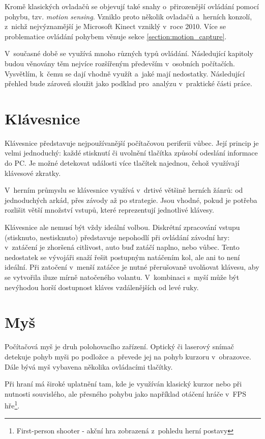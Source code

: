 \documentclass[thesis=B,czech,hidelinks]{FITthesis}[2012/06/26] %
\begin{document}
Kromě klasických ovladačů se objevují také snahy o~přirozenější ovládání pomocí pohybu, tzv. \textit{motion sensing}. Vzniklo proto několik ovladačů a~herních konzolí, z~nichž nejvýznamější je Microsoft Kinect vzniklý v~roce 2010.\cite{wikicontrollers} Více se problematice ovládání pohybem věnuje sekce \ref{section:motion_capture}.

V~současné době se využívá mnoho různých typů ovládání. Následující kapitoly budou věnovány těm nejvíce rozšířeným především v~osobních počítačích. Vysvětlím, k~čemu se dají vhodně využít a~jaké mají nedostatky. Následující přehled bude zároveň sloužit jako podklad pro~analýzu v~praktické části práce.

\section{Klávesnice}

Klávesnice představuje nejpoužívanější počítačovou periferii vůbec. Její princip je velmi jednoduchý: každé stisknutí či uvolnění tlačítka způsobí odeslání informace do PC. Je možné detekovat události více tlačítek najednou, čehož využívají klávesové zkratky.

V~herním průmyslu se klávesnice využívá v~drtivé většině herních žánrů: od jednoduchých arkád, přes závody až po strategie. Jsou vhodné, pokud je potřeba rozlišit větší množství vstupů, které reprezentují jednotlivé klávesy.

Klávesnice ale nemusí být vždy ideální volbou. Diskrétní zpracování vstupu (stisknuto, nestisknuto) představuje nepohodlí při ovládání závodní hry: v~zatáčení je zhoršená citlivost, auto buď zatáčí naplno, nebo vůbec. Tento nedostatek se vývojáři snaží řešit postupným natáčením kol, ale ani to není ideální. Při zatočení v~menší zatáčce je nutné přerušovaně uvolňovat klávesu, aby se vytvořila iluze mírně natočeného volantu. V~kombinaci s~myší může být nevýhodou horší dostupnost kláves vzdálenějších od levé ruky.

\section{Myš}

Počítačová myš je druh polohovacího zařízení. Optický či laserový snímač detekuje pohyb myši po podložce a~převede jej na pohyb kurzoru v~obrazovce. Dále bývá myš vybavena několika ovládacími tlačítky.

Při hraní má široké uplatnění tam, kde je využíván klasický kurzor nebo při nutnosti souvislého, ale přesného pohybu jako například otáčení hráče v~FPS hře\footnote{First-person shooter - akční hra zobrazená z~pohledu herní postavy}.
\end{document}
